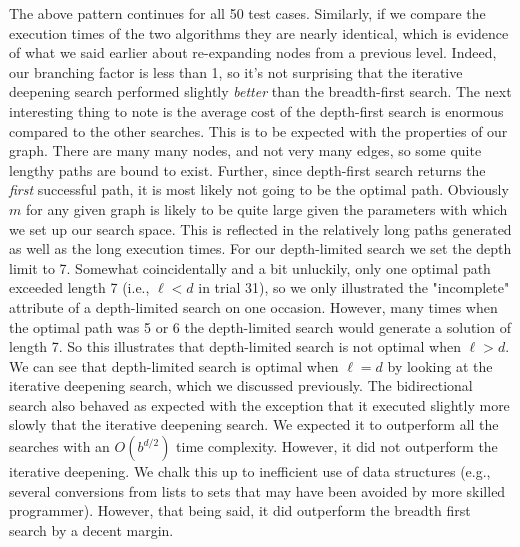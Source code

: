 \documentclass[a4paper,11pt]{report}
\begin{document}
The above pattern continues for all 50 test cases. Similarly, if we compare the
execution times of the two algorithms they are nearly identical, which is 
evidence of what we said earlier about re-expanding nodes from a previous
level.  Indeed, our branching factor is less than 1, so it's not surprising
that the iterative deepening search performed slightly \textit{better} than the
breadth-first search.\newline
\indent The next interesting thing to note is the average cost of the
depth-first search is enormous compared to the other searches.  This is to be
expected with the properties of our graph.  There are many many nodes, and not
very many edges, so some quite lengthy paths are bound to exist.  Further,
since depth-first search returns the \textit{first} successful path, it is most
likely not going to be the optimal path.  Obviously $m$ for any given graph is
likely to be quite large given the parameters with which we set up our search
space.  This is reflected in the relatively long paths generated as well as the
long execution times.\newline 
\indent For our depth-limited search we set the depth limit to 7.  Somewhat
coincidentally and a bit unluckily, only one optimal path exceeded length 7
(i.e., $\ell < d$ in trial 31), so we only illustrated the "incomplete"
attribute of a depth-limited search on one occasion. However, many times when
the optimal path was 5 or 6 the depth-limited search would generate a solution
of length 7.  So this illustrates that depth-limited search is not optimal when
$\ell > d$. We can see that depth-limited search is optimal when $\ell = d$ by
looking at the iterative deepening search, which we discussed
previously.\newline 
\indent The bidirectional search also behaved as expected with the exception
that it executed slightly more slowly that the iterative deepening search. We
expected it to outperform all the searches with an $O(b^{d / 2})$ time
complexity.  However, it did not outperform the iterative deepening.  We chalk
this up to inefficient use of data structures (e.g., several conversions from
lists to sets that may have been avoided by more skilled programmer).  However,
that being said, it did outperform the breadth first search by a decent margin.
\end{document}
